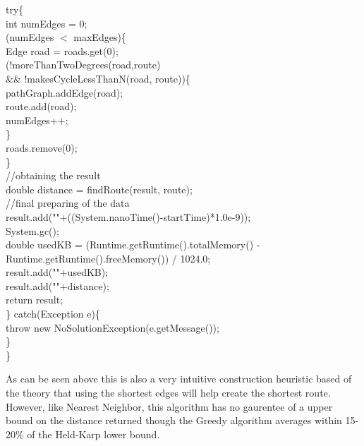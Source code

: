 \documentclass[midd]{thesis}
\newcommand{\tab}{\hspace*{2em}}
\begin{document}
\begin{codebox}
\tab try\{\\
\tab\tab int numEdges = 0;\\
\tab\tab\While(numEdges $<$ maxEdges)\{\\
\tab\tab\tab Edge road = roads.get(0);\\
\tab\tab\tab \If(!moreThanTwoDegrees(road,route)\\
\tab\tab\tab\tab \&\& !makesCycleLessThanN(road, route))\{\\
\tab\tab\tab\tab pathGraph.addEdge(road);\\
\tab\tab\tab\tab route.add(road);\\
\tab\tab\tab\tab numEdges++;\\
\tab\tab\tab\}\\\End
\tab\tab\tab roads.remove(0);\\
\tab\tab\}\\\End
\tab\tab //obtaining the result\\
\tab\tab double distance = findRoute(result, route);\\
\tab\tab //final preparing of the data\\
\tab\tab result.add(""+((System.nanoTime()-startTime)*1.0e-9));\\
\tab\tab System.gc();\\
\tab\tab double usedKB = (Runtime.getRuntime().totalMemory() - \\
\tab\tab\tab Runtime.getRuntime().freeMemory()) / 1024.0;\\
\tab\tab result.add(""+usedKB);\\
\tab\tab result.add(""+distance);\\
\tab\tab return result;\\
\tab\tab \} catch(Exception e)\{\\
\tab\tab\tab throw new NoSolutionException(e.getMessage());\\
\tab\tab\}\\
\}\\
\end{codebox}
\tab As can be seen above this is also a very intuitive construction heuristic based of the theory that using the shortest edges will help create the shortest route. However, like Nearest Neighbor, this algorithm has no gaurentee of a upper bound on the distance returned though the Greedy algorithm averages within 15-20\% of the Held-Karp lower bound\cite{htspc}.\\
\end{document}
